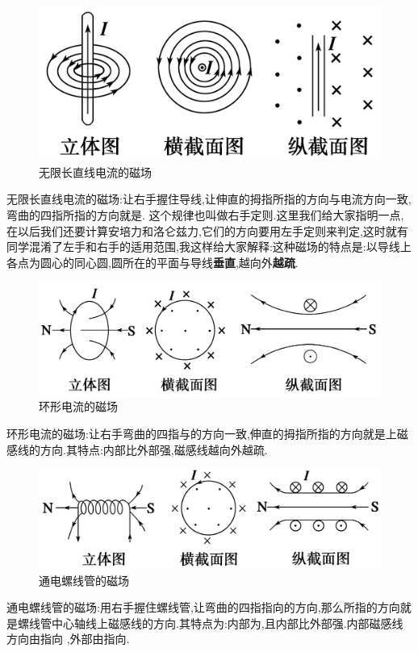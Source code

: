 \begin{figure}[H]
  \centering
  \includegraphics{./cichang/图片3.png}
  \caption{无限长直线电流的磁场}
\end{figure}
无限长直线电流的磁场:让右手握住导线,让伸直的拇指所指的方向与电流方向一致,弯曲的四指所指的方向就是. 这个规律也叫做右手定则.这里我们给大家指明一点,在以后我们还要计算安培力和洛仑兹力,它们的方向要用左手定则来判定,这时就有同学混淆了左手和右手的适用范围,我这样给大家解释:这种磁场的特点是:以导线上各点为圆心的同心圆,圆所在的平面与导线{\bf 垂直},越向外{\bf 越疏}.

\begin{figure}[H]
  \centering
  \includegraphics{./cichang/图片4.png}
  \caption{环形电流的磁场}
\end{figure}
环形电流的磁场:让右手弯曲的四指与的方向一致,伸直的拇指所指的方向就是上磁感线的方向.其特点:内部比外部强,磁感线越向外越疏.

\begin{figure}[H]
  \centering
  \includegraphics{./cichang/图片5.png}
  \caption{通电螺线管的磁场}
\end{figure}
通电螺线管的磁场:用右手握住螺线管,让弯曲的四指指向的方向,那么所指的方向就是螺线管中心轴线上磁感线的方向.其特点为:内部为,且内部比外部强.内部磁感线方向由指向 ,外部由指向.

